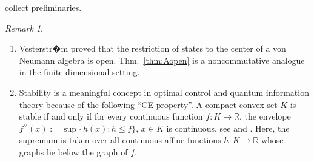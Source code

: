 \documentclass[a4paper,11pt,reqno]{amsart}
\newcommand{\R}{\mathbb{R}}
\theoremstyle{definition}
\theoremstyle{remark}
\newtheorem{rem}[thm]{Remark}
\numberwithin{equation}{section}
\begin{document}
collect preliminaries.
\par
%
\begin{rem}\label{rem:intro}~
\begin{enumerate}
\item[a)]
Vesterstr�m \cite{Vesterstrom1973} proved that the restriction of states 
to the center of a von Neumann algebra is open. Thm.~\ref{thm:Aopen}
is a noncommutative analogue in the finite-dimensional setting.
%
\item[b)]
Stability is a meaningful concept in optimal control 
\cite{Papadopoulou1982,Witsenhausen1968} and quantum information theory 
\cite{Shirokov2012} because of the following ``CE-property''. A 
compact convex set $K$ is stable if and only if for every continuous 
function $f:K\to\R$, the envelope $f^\vee(x):=\sup\{h(x): h\leq f\}$, 
$x\in K$ is continuous, see \cite{Vesterstrom1973,Brien1976} and
\cite{Shirokov2012}. Here, the supremum is taken over all continuous 
affine functions $h:K\to\R$ whose graphs lie below the graph of $f$. 
\end{enumerate}
\end{rem}
%
%
%
\end{document}
